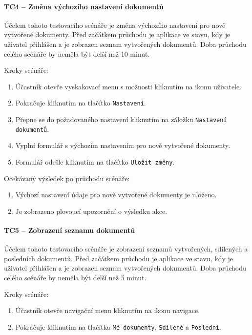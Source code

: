 \paragraph{TC4 -- Změna výchozího nastavení dokumentů}

Účelem tohoto testovacího scénáře je změna výchozího nastavení pro nově vytvořené dokumenty.
Před začátkem průchodu je aplikace ve stavu, kdy je uživatel přihlášen a je zobrazen seznam vytvořených dokumentů.
Doba průchodu celého scénáře by neměla být delší než 10 minut.

Kroky scénáře:
\begin{enumerate}
    \item Účastník otevře vyskakovací menu s možnosti kliknutím na ikonu uživatele.
    \item Pokračuje kliknutím na tlačítko \texttt{Nastavení}.
    \item Přepne se do požadovaného nastavení kliknutím na záložku \texttt{Nastavení dokumentů}.
    \item Vyplní formulář s výchozím nastavením pro nově vytvořené dokumenty.
    \item Formulář odešle kliknutím na tlačítko \texttt{Uložit změny}.
\end{enumerate}

Očekávaný výsledek po průchodu scénáře:
\begin{enumerate}
    \item Výchozí nastavení údaje pro nově vytvořené dokumenty je uloženo.
    \item Je zobrazeno plovoucí upozornění o výsledku akce.
\end{enumerate}


\paragraph{TC5 -- Zobrazení seznamu dokumentů}

Účelem tohoto testovacího scénáře je zobrazení seznamů vytvořených, sdílených a posledních dokumentů.
Před začátkem průchodu je aplikace ve stavu, kdy je uživatel přihlášen a je zobrazen seznam vytvořených dokumentů.
Doba průchodu celého scénáře by neměla být delší než 5 minut.

Kroky scénáře:
\begin{enumerate}
    \item Účastník otevře navigační menu kliknutím na ikonu navigace.
    \item Pokračuje kliknutím na tlačítka \texttt{Mé dokumenty}, \texttt{Sdílené} a \texttt{Poslední}.
\end{enumerate}

